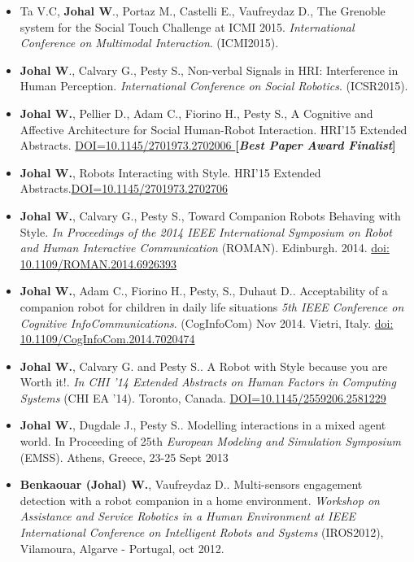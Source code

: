 \documentclass[10pt]{article}
\begin{document}
\begin{itemize}
\item Ta V.C, \textbf{Johal W}., Portaz M., Castelli E., Vaufreydaz D., The Grenoble system for the Social Touch Challenge at ICMI 2015. \emph{International Conference on Multimodal Interaction}. (ICMI2015). 
	
\item  \textbf{Johal W}., Calvary G., Pesty S., Non-verbal Signals in HRI: Interference in Human Perception. \emph{International Conference on Social Robotics}. (ICSR2015). 
	
	
\item  \textbf{Johal W.}, Pellier D., Adam C., Fiorino H., Pesty S., A Cognitive and Affective Architecture for Social Human-Robot Interaction. HRI'15 Extended Abstracts. \href{http://doi.acm.org/10.1145/2701973.2702006}{DOI=10.1145/2701973.2702006 }  \textbf{[\textit{Best Paper Award Finalist}]}
\item  \textbf{Johal W.}, Robots Interacting with Style. HRI'15 Extended Abstracts.\href{http://doi.acm.org/10.1145/2701973.2702706}{DOI=10.1145/2701973.2702706}   

\item \textbf{Johal W.}, Calvary G., Pesty S., Toward Companion Robots Behaving with Style. \emph{In Proceedings of the 2014 IEEE International Symposium on Robot and Human Interactive Communication} (ROMAN). Edinburgh. 2014. \href{ http://ieeexplore.ieee.org/stamp/stamp.jsp?tp=&arnumber=6926393&isnumber=6926219}{doi: 10.1109/ROMAN.2014.6926393}

\item \textbf{Johal W.}, Adam C., Fiorino H., Pesty, S., Duhaut D.. Acceptability of a companion
robot for children in daily life
situations \emph{5th IEEE Conference on Cognitive InfoCommunications}. (CogInfoCom) Nov 2014. Vietri, Italy. \href{http://ieeexplore.ieee.org/stamp/stamp.jsp?tp=&arnumber=7020474&isnumber=7020399}{doi: 10.1109/CogInfoCom.2014.7020474}


\item \textbf{Johal W.}, Calvary G. and  Pesty S.. A Robot with Style because you are Worth it!.  \emph{In CHI '14 Extended Abstracts on Human Factors in Computing Systems} (CHI EA '14). Toronto, Canada. \href{http://doi.acm.org/10.1145/2559206.2581229}{DOI=10.1145/2559206.2581229}

\item \textbf{Johal W.}, Dugdale J.,  Pesty S.. Modelling interactions in a mixed agent world. In Proceeding of 25th \emph{European Modeling and Simulation Symposium} (EMSS). Athens, Greece, 23-25 Sept 2013

\item  \textbf{Benkaouar (Johal) W.}, Vaufreydaz D.. Multi-sensors engagement detection with a robot companion in a home environment. \emph{Workshop on Assistance and Service Robotics in a Human Environment at IEEE International Conference on Intelligent Robots and Systems} (IROS2012), Vilamoura, Algarve - Portugal, oct 2012.

  

\end{itemize}
\end{document}
